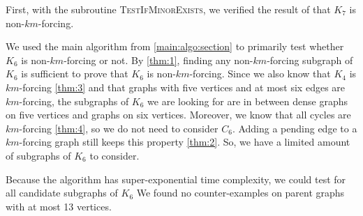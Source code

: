 First, with the subroutine \textsc{TestIfMinorExists}, we verified the result of \cite{matthias_2022} that $K_7$ is non-$km$-forcing.

We used the main algorithm from \ref{main:algo:section} to primarily test whether $K_6$ is non-$km$-forcing or not.  
By \ref{thm:1}, finding any non-$km$-forcing subgraph of $K_6$ is sufficient to prove that $K_6$ is non-$km$-forcing.  
Since we also know that $K_4$ is $km$-forcing \ref{thm:3} and that graphs with five vertices and at most six edges are $km$-forcing,  
the subgraphs of $K_6$ we are looking for are in between dense graphs on five vertices and graphs on six vertices.  
Moreover, we know that all cycles are $km$-forcing \ref{thm:4}, so we do not need to consider $C_6$.  
Adding a pending edge to a $km$-forcing graph still keeps this property \ref{thm:2}.  
So, we have a limited amount of subgraphs of $K_6$ to consider.

Because the algorithm has super-exponential time complexity, we could test for all candidate subgraphs of $K_6$  
We found no counter-examples on parent graphs with at most 13 vertices.
